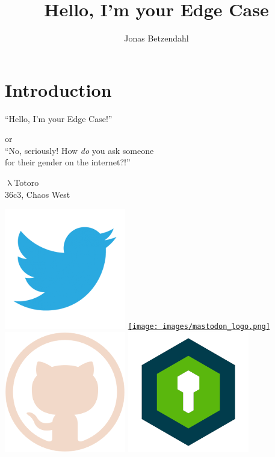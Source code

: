 \documentclass[aspectratio=169,x11names]{beamer}
\author{Jonas Betzendahl}
\title{Hello, I'm your Edge Case}
\begin{document}



\section{Introduction}

\begin{frame}
\begin{center}
\vfill
\huge ``Hello, I'm your Edge Case!''
\normalsize 
\smallskip
\smallskip

or\\
``No, seriously! How \emph{do} you ask someone\\ for their gender on the internet?!''

\bigskip\bigskip

\large $\uplambda$Totoro\\
36c3, Chaos West
\bigskip\bigskip

\href{https://twitter.com/lambdatotoro}{\includegraphics[scale=0.125]{images/twitter_logo.png}}
\href{https://chaos.social/@lambdatotoro}{\texttt{[image: images/mastodon\_logo.png]}}
\href{https://github.com/lambdaTotoro}{\includegraphics[scale=0.125]{images/github_logo.png}}
\href{https://whispeer.de/en/user/jbetzend}{\includegraphics[scale=0.125]{images/whispeer_logo.png}}


\end{center}
\end{frame}
\end{document}
